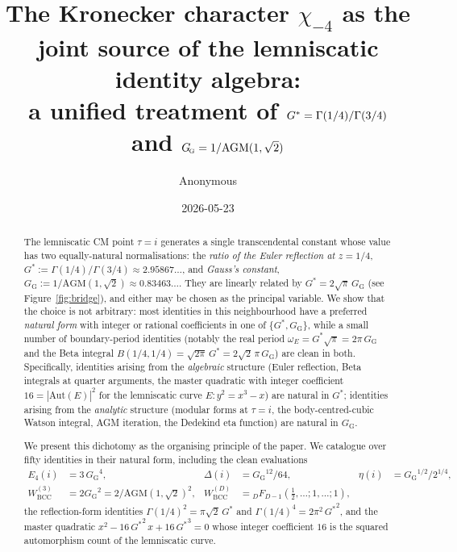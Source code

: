 \documentclass[11pt]{article}
\title{The Kronecker character $\chi_{-4}$ as the joint source of
the lemniscatic identity algebra:\\
\large a unified treatment of $\Gs = \Gamma(1/4)/\Gamma(3/4)$ and
$\GG = 1/\AGM(1,\sqrt{2})$}
\author{Anonymous}
\date{2026-05-23}
\theoremstyle{definition}
\theoremstyle{remark}
\newcommand{\Gs}{G^{*}}
\newcommand{\Gss}{{G^{*}}^{2}}
\newcommand{\Gsss}{{G^{*}}^{3}}
\newcommand{\GG}{G_{\!\scriptscriptstyle\mathrm{G}}}
\newcommand{\AGM}{\mathrm{AGM}}
\newcommand{\Aut}{\mathrm{Aut}}
\begin{document}
\maketitle

\begin{abstract}
The lemniscatic CM point $\tau = i$ generates a single transcendental constant
whose value has two equally-natural normalisations: the \emph{ratio of
the Euler reflection at $z = 1/4$},
$\Gs := \Gamma(1/4)/\Gamma(3/4) \approx 2.95867\ldots$, and \emph{Gauss's
constant},
$\GG := 1/\AGM(1, \sqrt 2) \approx 0.83463\ldots$. They are linearly related
by $\Gs = 2\sqrt{\pi}\,\GG$ (see Figure~\ref{fig:bridge}), and either
may be chosen as the principal variable. We show that the choice is not
arbitrary: most identities in this neighbourhood have a preferred
\emph{natural form} with integer or rational coefficients in one of
$\{\Gs, \GG\}$, while a small number of
boundary-period identities (notably the real period
$\omega_E = \Gs\sqrt\pi = 2\pi\,\GG$ and the Beta integral
$B(1/4,1/4) = \sqrt{2\pi}\,\Gs = 2\sqrt 2\,\pi\,\GG$) are clean in both.
Specifically, identities arising from the \emph{algebraic} structure
(Euler reflection, Beta integrals at quarter arguments, the master
quadratic with integer coefficient $16 = |\Aut(E)|^2$ for the lemniscatic
curve $E: y^2 = x^3 - x$) are natural in $\Gs$; identities arising from
the \emph{analytic} structure (modular forms at $\tau = i$, the
body-centred-cubic Watson integral, AGM iteration, the Dedekind eta
function) are natural in $\GG$.

We present this dichotomy as the organising principle of the paper. We
catalogue over fifty identities in their natural form, including the
clean evaluations
\begin{align*}
E_4(i) &= 3\,{\GG}^4, & \Delta(i) &= {\GG}^{12}/64, & \eta(i) &= {\GG}^{1/2}/2^{1/4}, \\
W^{(3)}_{\mathrm{BCC}} &= 2{\GG}^2 = 2/\AGM(1,\sqrt 2)^2, & W^{(D)}_{\mathrm{BCC}} &= {}_DF_{D-1}\!\!\left(\tfrac12,\ldots;1,\ldots;1\right),
\end{align*}
the reflection-form identities $\Gamma(1/4)^2 = \pi\sqrt 2\,\Gs$ and
$\Gamma(1/4)^4 = 2\pi^2\,\Gss$, and the master quadratic
$x^2 - 16\,\Gss\,x + 16\,\Gsss = 0$ whose integer coefficient $16$ is
the squared automorphism count of the lemniscatic curve.


\end{abstract}
\end{document}
